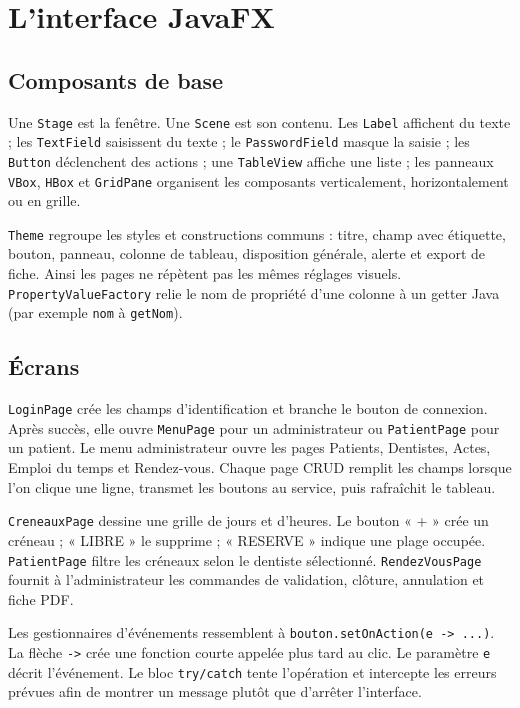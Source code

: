\documentclass[11pt,a4paper]{report}
\begin{document}
\chapter{L'interface JavaFX}
\section{Composants de base}
Une \texttt{Stage} est la fenêtre. Une \texttt{Scene} est son contenu. Les \texttt{Label} affichent du texte ; les \texttt{TextField} saisissent du texte ; le \texttt{PasswordField} masque la saisie ; les \texttt{Button} déclenchent des actions ; une \texttt{TableView} affiche une liste ; les panneaux \texttt{VBox}, \texttt{HBox} et \texttt{GridPane} organisent les composants verticalement, horizontalement ou en grille.

\texttt{Theme} regroupe les styles et constructions communs : titre, champ avec étiquette, bouton, panneau, colonne de tableau, disposition générale, alerte et export de fiche. Ainsi les pages ne répètent pas les mêmes réglages visuels. \texttt{PropertyValueFactory} relie le nom de propriété d'une colonne à un getter Java (par exemple \texttt{nom} à \texttt{getNom}).

\section{Écrans}
\texttt{LoginPage} crée les champs d'identification et branche le bouton de connexion. Après succès, elle ouvre \texttt{MenuPage} pour un administrateur ou \texttt{PatientPage} pour un patient. Le menu administrateur ouvre les pages Patients, Dentistes, Actes, Emploi du temps et Rendez-vous. Chaque page CRUD remplit les champs lorsque l'on clique une ligne, transmet les boutons au service, puis rafraîchit le tableau.

\texttt{CreneauxPage} dessine une grille de jours et d'heures. Le bouton « + » crée un créneau ; « LIBRE » le supprime ; « RESERVE » indique une plage occupée. \texttt{PatientPage} filtre les créneaux selon le dentiste sélectionné. \texttt{RendezVousPage} fournit à l'administrateur les commandes de validation, clôture, annulation et fiche PDF.

Les gestionnaires d'événements ressemblent à \texttt{bouton.setOnAction(e -> ...)}. La flèche \texttt{->} crée une fonction courte appelée plus tard au clic. Le paramètre \texttt{e} décrit l'événement. Le bloc \texttt{try/catch} tente l'opération et intercepte les erreurs prévues afin de montrer un message plutôt que d'arrêter l'interface.
\end{document}
